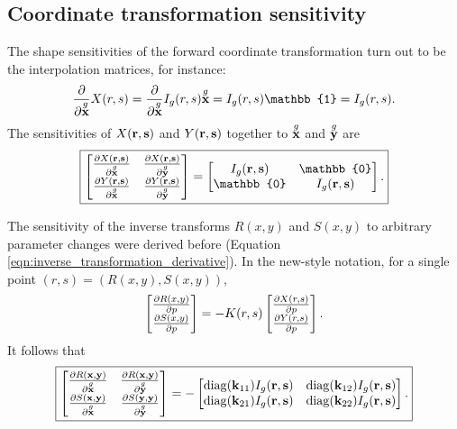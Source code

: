 \subsection{Coordinate transformation sensitivity}
The shape sensitivities of the forward coordinate transformation turn out to be the interpolation matrices, for instance:
%
\begin{equation}
\pp{}{\g{\ve x}}X(r,s) = \pp{}{\g{\ve x}}I_g(r,s) \g{\ve x} = I_g(r,s) \mathbb{1} = I_g(r,s).
\end{equation}
%
The sensitivities of $X(\textbf{r}, \textbf{s})$ and $Y(\textbf{r}, \textbf{s})$ together to $\overset{g}{\textbf{x}}$ and $\overset{g}{\textbf{y}}$ are
%
\begin{equation}
\boxed{
\begin{bmatrix}
\pp{X(\ve r,\ve s)}{\g{\ve x}} & \pp{X(\ve r,\ve s)}{\g{\ve y}} \\
\pp{Y(\ve r,\ve s)}{\g{\ve x}} & \pp{Y(\ve r,\ve s)}{\g{\ve y}}
\end{bmatrix}
=
\begin{bmatrix}
I_g(\ve r,\ve s) & \mathbb{0} \\
\mathbb{0} & I_g(\ve r,\ve s)
\end{bmatrix}.
}%
\end{equation}

The sensitivity of the inverse transforms $R(x,y)$ and $S(x,y)$ to arbitrary parameter changes were derived before (Equation \ref{eqn:inverse_transformation_derivative}).  In the new-style notation, for a single point $(r,s) = (R(x,y), S(x,y))$,
%
\begin{equation}
\begin{bmatrix} \frac{\partial{R(x,y)}}{\partial{p}} \\ \frac{\partial{S(x,y)}}{\partial{p}} \end{bmatrix}
=
-K(r,s)
\begin{bmatrix}
\frac{\partial{X(r,s)}}{\partial{p}} \\ \frac{\partial{Y(r,s)}}{\partial{p}}
\end{bmatrix}.
\end{equation}
%
It follows that
%
\begin{equation}
\boxed{
\begin{bmatrix}
\pp{R(\ve x,\ve y)}{\g{\ve x}} & \pp{R(\ve x,\ve y)}{\g{\ve y}} \\
\pp{S(\ve x,\ve y)}{\g{\ve x}} & \pp{S(\ve y,\ve y)}{\g{\ve y}}
\end{bmatrix}
=
-\begin{bmatrix}
\operatorname{diag}(\ve{k}_{11}) I_g(\ve r, \ve s) & \operatorname{diag}(\ve{k}_{12}) I_g(\ve r, \ve s) \\
\operatorname{diag}(\ve{k}_{21}) I_g(\ve r, \ve s) & \operatorname{diag}(\ve{k}_{22}) I_g(\ve r, \ve s)
\end{bmatrix}.
}%
\end{equation}

